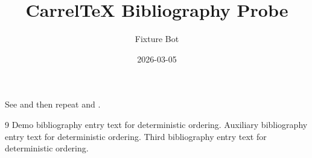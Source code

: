 \documentclass{article}
\title{CarrelTeX Bibliography Probe}
\author{Fixture Bot}
\date{2026-03-05}
\begin{document}
\maketitle

See \cite{demo-key,aux-key,third-key} and then repeat \cite{demo-key} and \cite{aux-key}.
\begin{thebibliography}{9}
Demo bibliography entry text for deterministic ordering.
Auxiliary bibliography entry text for deterministic ordering.
Third bibliography entry text for deterministic ordering.
\end{thebibliography}
\printbibliography
\end{document}
